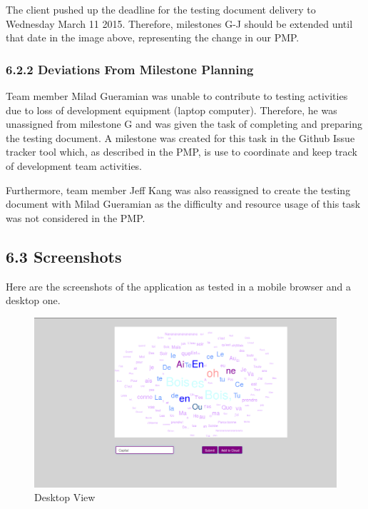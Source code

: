 \documentclass[]{article}
\begin{document}
The client pushed up the deadline for the testing document delivery to
Wednesday March 11 2015. Therefore, milestones G-J should be extended
until that date in the image above, representing the change in our PMP.

\subsubsection{6.2.2 Deviations From Milestone
Planning}\label{deviations-from-milestone-planning}

Team member Milad Gueramian was unable to contribute to testing
activities due to loss of development equipment (laptop computer).
Therefore, he was unassigned from milestone G and was given the task of
completing and preparing the testing document. A milestone was created
for this task in the Github Issue tracker tool which, as described in
the PMP, is use to coordinate and keep track of development team
activities.

Furthermore, team member Jeff Kang was also reassigned to create the
testing document with Milad Gueramian as the difficulty and resource
usage of this task was not considered in the PMP.

\subsection{6.3 Screenshots}\label{screenshots}

Here are the screenshots of the application as tested in a mobile browser and a desktop one.

\begin{figure}[htbp]
\centering
\includegraphics{desktop.png}
\caption{Desktop View}
\end{figure}
\end{document}
